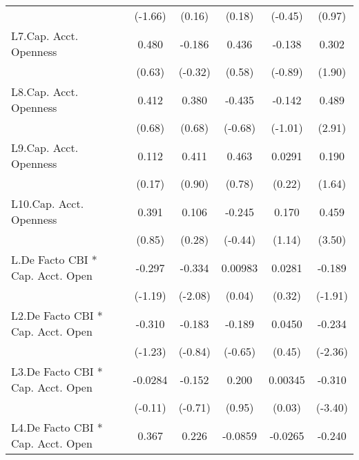 {\begin{longtable}{l*{5}{c}}
                &  (-1.66)         &   (0.16)         &   (0.18)         &  (-0.45)         &   (0.97)         \\
[1em]
L7.Cap. Acct. Openness&    0.480         &   -0.186         &    0.436         &   -0.138         &    0.302         \\
                &   (0.63)         &  (-0.32)         &   (0.58)         &  (-0.89)         &   (1.90)         \\
[1em]
L8.Cap. Acct. Openness&    0.412         &    0.380         &   -0.435         &   -0.142         &    0.489\sym{**} \\
                &   (0.68)         &   (0.68)         &  (-0.68)         &  (-1.01)         &   (2.91)         \\
[1em]
L9.Cap. Acct. Openness&    0.112         &    0.411         &    0.463         &   0.0291         &    0.190         \\
                &   (0.17)         &   (0.90)         &   (0.78)         &   (0.22)         &   (1.64)         \\
[1em]
L10.Cap. Acct. Openness&    0.391         &    0.106         &   -0.245         &    0.170         &    0.459\sym{***}\\
                &   (0.85)         &   (0.28)         &  (-0.44)         &   (1.14)         &   (3.50)         \\
[1em]
L.De Facto CBI * Cap. Acct. Open&   -0.297         &   -0.334\sym{*}  &  0.00983         &   0.0281         &   -0.189         \\
                &  (-1.19)         &  (-2.08)         &   (0.04)         &   (0.32)         &  (-1.91)         \\
[1em]
L2.De Facto CBI * Cap. Acct. Open&   -0.310         &   -0.183         &   -0.189         &   0.0450         &   -0.234\sym{*}  \\
                &  (-1.23)         &  (-0.84)         &  (-0.65)         &   (0.45)         &  (-2.36)         \\
[1em]
L3.De Facto CBI * Cap. Acct. Open&  -0.0284         &   -0.152         &    0.200         &  0.00345         &   -0.310\sym{***}\\
                &  (-0.11)         &  (-0.71)         &   (0.95)         &   (0.03)         &  (-3.40)         \\
[1em]
L4.De Facto CBI * Cap. Acct. Open&    0.367         &    0.226         &  -0.0859         &  -0.0265         &   -0.240\sym{*}  \\

\end{longtable}}
